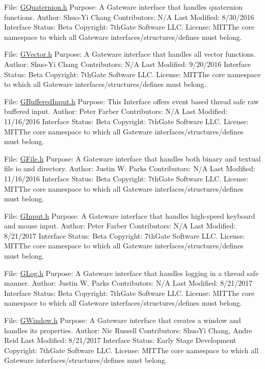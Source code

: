 File\+: \hyperlink{GQuaternion_8h_source}{G\+Quaternion.\+h} Purpose\+: A Gateware interface that handles quaternion functions. Author\+: Shuo-\/\+Yi Chang Contributors\+: N/A Last Modified\+: 8/30/2016 Interface Status\+: Beta Copyright\+: 7th\+Gate Software L\+LC. License\+: M\+I\+T\+The core namespace to which all Gateware interfaces/structures/defines must belong.

File\+: \hyperlink{GVector_8h_source}{G\+Vector.\+h} Purpose\+: A Gateware interface that handles all vector functions. Author\+: Shuo-\/\+Yi Chang Contributors\+: N/A Last Modified\+: 9/20/2016 Interface Status\+: Beta Copyright\+: 7th\+Gate Software L\+LC. License\+: M\+I\+T\+The core namespace to which all Gateware interfaces/structures/defines must belong.

File\+: \hyperlink{GBufferedInput_8h_source}{G\+Buffered\+Input.\+h} Purpose\+: This Interface offers event based thread safe raw buffered input. Author\+: Peter Farber Contributors\+: N/A Last Modified\+: 11/16/2016 Interface Status\+: Beta Copyright\+: 7th\+Gate Software L\+LC. License\+: M\+I\+T\+The core namespace to which all Gateware interfaces/structures/defines must belong.

File\+: \hyperlink{GFile_8h_source}{G\+File.\+h} Purpose\+: A Gateware interface that handles both binary and textual file io and directory. Author\+: Justin W. Parks Contributors\+: N/A Last Modified\+: 11/16/2016 Interface Status\+: Beta Copyright\+: 7th\+Gate Software L\+LC. License\+: M\+I\+T\+The core namespace to which all Gateware interfaces/structures/defines must belong.

File\+: \hyperlink{GInput_8h_source}{G\+Input.\+h} Purpose\+: A Gateware interface that handles high-\/speed keyboard and mouse input. Author\+: Peter Farber Contributors\+: N/A Last Modified\+: 8/21/2017 Interface Status\+: Beta Copyright\+: 7th\+Gate Software L\+LC. License\+: M\+I\+T\+The core namespace to which all Gateware interfaces/structures/defines must belong.

File\+: \hyperlink{GLog_8h_source}{G\+Log.\+h} Purpose\+: A Gateware interface that handles logging in a thread safe manner. Author\+: Justin W. Parks Contributors\+: N/A Last Modified\+: 8/21/2017 Interface Status\+: Beta Copyright\+: 7th\+Gate Software L\+LC. License\+: M\+I\+T\+The core namespace to which all Gateware interfaces/structures/defines must belong.

File\+: \hyperlink{GWindow_8h_source}{G\+Window.\+h} Purpose\+: A Gateware interface that creates a window and handles its properties. Author\+: Nic Russell Contributors\+: Shuo\+Yi Chang, Andre Reid Last Modified\+: 8/21/2017 Interface Status\+: Early Stage Development Copyright\+: 7th\+Gate Software L\+LC. License\+: M\+I\+T\+The core namespace to which all Gateware interfaces/structures/defines must belong. 